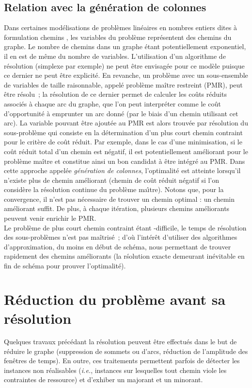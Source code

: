 \documentclass[10pt,francais]{llncs}
\begin{document}
\subsection{Relation avec la g\'en\'eration de colonnes}\label{sub-desc-gc} Dans certaines mod\'elisations de probl\`emes lin\'eaires en nombres entiers dites \`a formulation \og chemins \fg{}, les variables du probl\`eme repr\'esentent des chemins du graphe. Le nombre de chemins dans un graphe \'etant potentiellement exponentiel, il en est de m\^eme du nombre de variables. L'utilisation d'un algorithme de r\'esolution (simplexe par exemple) ne peut \^etre envisag\'ee pour ce mod\`ele puisque ce dernier ne peut \^etre explicit\'e. En revanche, un probl\`eme avec un sous-ensemble de variables de taille raisonnable, appel\'e probl\`eme ma\^itre restreint (PMR), peut \^etre r\'esolu~; la r\'esolution de ce dernier permet de calculer les co\^uts r\'eduits associ\'es \`a chaque arc du graphe, que l'on peut interpr\'eter comme le co\^ut d'opportunit\'e \`a emprunter un arc donn\'e (par le biais d'un chemin utilisant cet arc). La variable pouvant \^etre ajout\'ee au PMR est alors trouv\'ee par r\'esolution du sous-probl\`eme qui consiste en la d\'etermination d'un plus court chemin contraint pour le crit\`ere de co\^ut r\'eduit. Par exemple, dans le cas d'une minimisation, si le co\^ut r\'eduit total d'un chemin est n\'egatif, il est potentiellement am\'eliorant pour le probl\`eme ma\^itre et constitue ainsi un bon candidat \`a \^etre int\'egr\'e au PMR. Dans cette approche appel\'ee {\em g\'en\'eration de colonnes}, l'optimalit\'e est atteinte lorsqu'il n'existe plus de chemin am\'eliorant (chemin de co\^ut r\'eduit n\'egatif si l'on consid\`ere la r\'esolution continue du probl\`eme ma\^{\i}tre). Notons que, pour la convergence, il n'est pas n\'ecessaire de trouver un chemin optimal : un chemin am\'eliorant suffit. De plus, \`a chaque it\'eration, plusieurs chemins am\'eliorants peuvent venir enrichir le PMR. \\
Le probl\`eme de plus court chemin contraint \'etant -difficile, le temps de r\'esolution des sous-probl\`emes n'est pas ma\^itris\'e~; d'o\`u l'int\'er\^et d'utiliser des algorithmes d'approximation, du moins en d\'ebut de sch\'ema, nous permettant de trouver rapidement des chemins am\'eliorants (la r\'solution exacte demeurant in\'evitable en fin de sch\'ema pour prouver l'optimalit\'e). 


\section{R\'eduction du probl\`eme avant sa r\'esolution}\label{sec-reduc}
Quelques travaux pr\'ec\'edant la r\'esolution peuvent \^etre effectu\'es dans le but de r\'eduire le graphe (suppression de sommets ou d'arcs, r\'eduction de l'amplitude des fen\^etres de temps). En outre, ces traitements permettent parfois de d\'etecter les instances non r\'ealisables ({\em i.e.}, instances sur lesquelles tout chemin viole les contraintes de ressource) et d'exhiber un majorant et un minorant.
\end{document}
